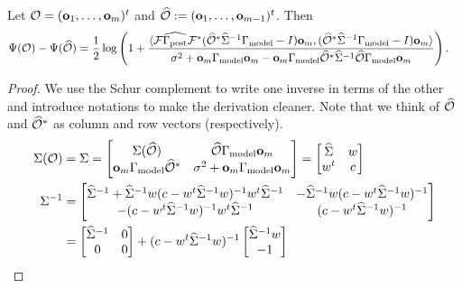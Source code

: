 \documentclass{amsart}
\numberwithin{equation}{section}
\begin{document}
\begin{lemma}\label{lemma:design increase}
  Let $\mathcal{O} = (\mathbf{o}_1,\dots,\mathbf{o}_m)^t$ and $\widehat{\mathcal{O}} := (\mathbf{o}_1,\dots,\mathbf{o}_{m-1})^t$. Then
  \begin{align*}
    \Psi( \mathcal{O} ) - \Psi (\widehat{\mathcal{O}} ) &=
    \frac12 \log \left ( 1 + \frac{
      \langle \mathcal{F} \widehat{\Gamma_{\textup{post}}} \mathcal{F}^* (\widehat{\mathcal{O}}^* \widehat{\Sigma}^{-1} \Gamma_{\textup{model}} - I ) \mathbf{o}_m,
      (\widehat{\mathcal{O}}^* \widehat{\Sigma}^{-1} \Gamma_{\textup{model}} - I ) \mathbf{o}_m \rangle
    }{
      \sigma^2 + \mathbf{o}_m \Gamma_{\textup{model}} \mathbf{o}_m - \mathbf{o}_m \Gamma_{\textup{model}} \widehat{\mathcal{O}}^* \widehat{\Sigma}^{-1} \widehat{\mathcal{O}} \Gamma_{\textup{model}} \mathbf{o}_m 
    }       
    \right ).
  \end{align*}
\end{lemma}
\begin{proof}
  We use the Schur complement to write one inverse in terms of the other and
  introduce notations to make the derivation cleaner. Note that we think of
  $\widehat{\mathcal{O}}$ and $\widehat{\mathcal{O}}^*$ as column and row vectors (respectively).
  \begin{align*}
    \Sigma( \obs ) &= \Sigma = 
    \begin{bmatrix}
      \Sigma (\obsm )           & \obsm \modcov \meas_m \\
      \meas_m \modcov \obsm^*   & \sigma^2 + \meas_m \modcov \meas_m
    \end{bmatrix}
    =
    \begin{bmatrix}
      \Sigmam   & w \\
      w^t       & c
    \end{bmatrix}\\
    \Sigma^{-1} &=
    \begin{bmatrix}
      \Sigmam^{-1} + \Sigmam^{-1} w ( c - w^t \Sigmam^{-1} w)^{-1} w^t \Sigmam^{-1} & - \Sigmam^{-1} w ( c - w^t \Sigmam^{-1} w)^{-1} \\
      -( c - w^t \Sigmam^{-1} w)^{-1} w^t \Sigmam^{-1}                            &  ( c - w^t \Sigmam^{-1} w)^{-1}
    \end{bmatrix} \\
    &=
    \begin{bmatrix}
      \Sigmam^{-1} & 0 \\
      0           & 0 
    \end{bmatrix}
    + (c -w^t \Sigmam^{-1} w )^{-1}
    \begin{bmatrix}
      \Sigmam^{-1} w \\
      -1
    \end{bmatrix}

\end{align*}
\end{proof}
\end{document}
